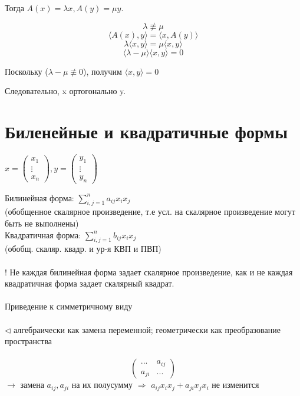 \documentclass[12pt]{article}
\begin{document}
    Тогда $A(x) = \lambda x, A(y) = \mu y$.

    \[
        \lambda \not \equiv \mu
    \]
    \[
        \langle A(x), y \rangle = \langle x, A(y) \rangle
    \]
    \[
        \lambda \langle x, y\rangle = \mu \langle x, y\rangle
    \]
    \[
        \langle \lambda - \mu\rangle\langle x, y\rangle = 0
    \]

    Поскольку ($\lambda - \mu \not\equiv 0$), получим $\langle x, y\rangle = 0$

    Следовательно, x ортогонально y.

    \section{Биленейные и квадратичные формы}

    $x =
        \begin{pmatrix}
            x_1    \\
            \vdots \\
            x_n
        \end{pmatrix},
        y =
        \begin{pmatrix}
            y_1    \\
            \vdots \\
            y_n
        \end{pmatrix}$

    Билинейная форма: \(\sum\limits_{i,j=1}^n a_{ij}x_ix_j\)\\
    (обобщенное скалярное произведение, т.е усл. на скалярное произведение могут быть не выполнены)\\
    Квадратичная форма: \(\sum\limits_{i,j=1}^n b_{ij}x_ix_j\)\\
    (обобщ. скаляр. квадр. и ур-я КВП и ПВП)\\\\
    ! Не каждая билинейная форма задает скалярное произведение, как и не каждая квадратичная форма задает скалярный квадрат. \\\\
    Приведение к симметричному виду\\\\
    \(\triangleleft\) алгебраически как замена переменной; геометрически как преобразование пространства\\\\
    \[
        \begin{pmatrix}
            ...    & a_{ij} \\
            a_{ji} & ...
        \end{pmatrix}
    \]
    $\rightarrow$ замена $a_{ij}, a_{ji}$ на их полусумму $\Rightarrow$
    $a_{ij}x_ix_j + a_{ji}x_jx_i$ не изменится\\\\
\end{document}
